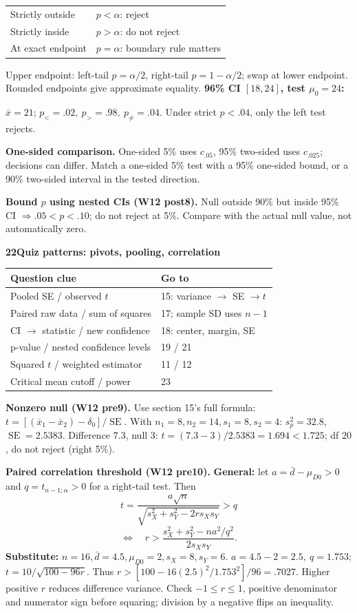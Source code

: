 \documentclass[a4paper,landscape]{article}
\newcommand{\head}[2][late]{\par\vspace{3pt}\noindent\colorbox{#1}{\parbox{\dimexpr\linewidth-6pt}{\color{white}\bfseries #2}}\par\vspace{1pt}}
\newcommand{\cue}[1]{\par\textbf{#1}\enspace}
\newcommand{\SE}{\operatorname{SE}}
\newcommand{\xb}{\bar x}
\newcommand{\db}{\bar d}
\newcommand{\col}{\par\vfill\columnbreak}
\newcommand{\tblhead}[1]{\textbf{#1}}
\begin{document}
\begin{multicols*}{4}
\begin{tabular}{@{}L{.44\linewidth}L{.50\linewidth}@{}}
Strictly outside & \(p<\alpha\): reject\\
Strictly inside & \(p>\alpha\): do not reject\\
At exact endpoint & \(p=\alpha\): boundary rule matters
\end{tabular}
Upper endpoint: left-tail \(p=\alpha/2\), right-tail \(p=1-\alpha/2\); swap at lower endpoint. Rounded endpoints give approximate equality.
\textbf{96\% CI \([18,24]\), test \(\mu_0=24\):}\par
\(\xb=21\); \(p_<=.02,\ p_>=.98,\ p_{\ne}=.04\). Under strict \(p<.04\), only the left test rejects.
\cue{One-sided comparison.} One-sided 5\% uses \(c_{.05}\), 95\% two-sided uses \(c_{.025}\); decisions can differ. Match a one-sided 5\% test with a 95\% one-sided bound, or a 90\% two-sided interval in the tested direction.
\cue{Bound \(p\) using nested CIs (W12 post8).} Null outside 90\% but inside 95\% CI \(\Rightarrow .05<p<.10\); do not reject at 5\%. Compare with the actual null value, not automatically zero.
\col
\head{22\quad Quiz patterns: pivots, pooling, correlation}
\begin{tabular}{@{}L{.50\linewidth}L{.44\linewidth}@{}}
\tblhead{Question clue} & \tblhead{Go to}\\\hline
Pooled SE / observed \(t\) & 15: variance \(\to\) SE \(\to t\)\\
Paired raw data / sum of squares & 17; sample SD uses \(n-1\)\\
CI \(\to\) statistic / new confidence & 18: center, margin, SE\\
p-value / nested confidence levels & 19 / 21\\
Squared \(t\) / weighted estimator & 11 / 12\\
Critical mean cutoff / power & 23
\end{tabular}
\cue{Nonzero null (W12 pre9).} Use section 15's full formula: \(t=[(\xb_1-\xb_2)-\delta_0]/\SE\). With \(n_1=8,n_2=14,s_1=8,s_2=4\): \(s_p^2=32.8\), \(\SE=2.5383\). Difference \(7.3\), null \(3\): \(t=(7.3-3)/2.5383=1.694<1.725\); df \(20\), do not reject (right 5\%).
\cue{Paired correlation threshold (W12 pre10).}
\textbf{General:} let \(a=\db-\mu_{D0}>0\) and \(q=t_{n-1;\alpha}>0\) for a right-tail test. Then
\[t=\frac{a\sqrt n}{\sqrt{s_X^2+s_Y^2-2rs_Xs_Y}}>q\]
\[\Longleftrightarrow\quad r>\frac{s_X^2+s_Y^2-na^2/q^2}{2s_Xs_Y}.\]
\textbf{Substitute:}
\(n=16,\db=4.5,\mu_{D0}=2,s_X=8,s_Y=6\).
\(a=4.5-2=2.5,\ q=1.753\); \(t=10/\sqrt{100-96r}\). Thus \(r>[100-16(2.5)^2/1.753^2]/96=.7027\).
Higher positive \(r\) reduces difference variance. Check \(-1\le r\le1\), positive denominator and numerator sign before squaring; division by a negative flips an inequality.

\end{multicols*}
\end{document}
